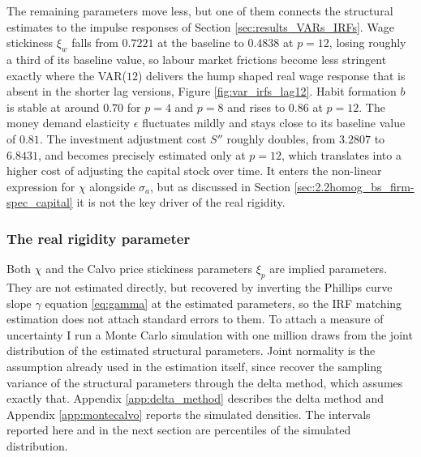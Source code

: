 \documentclass[12pt, a4paper]{article}
\begin{document}
The remaining parameters move less, but one of them connects the structural estimates to the
impulse responses of Section \ref{sec:results_VARs_IRFs}. Wage stickiness $\xi_w$ falls from
$0.7221$ at the baseline to $0.4838$ at $p = 12$, losing roughly a third of its baseline value,
so labour market frictions become less stringent exactly where the VAR($12$) delivers the hump
shaped real wage response that is absent in the shorter lag versions, Figure
\ref{fig:var_irfs_lag12}. Habit formation $b$ is stable at around $0.70$ for $p = 4$ and
$p = 8$ and rises to $0.86$ at $p = 12$. The money demand elasticity $\epsilon$ fluctuates
mildly and stays close to its baseline value of $0.81$. The investment adjustment cost $S''$
roughly doubles, from $3.2807$ to $6.8431$, and becomes precisely estimated only at $p = 12$,
which translates into a higher cost of adjusting the capital stock over time. It enters the
non-linear expression for $\chi$ alongside $\sigma_a$, but as discussed in Section
\ref{sec:2.2homog_bs_firm-spec_capital} it is not the key driver of the real rigidity.

\subsubsection*{The real rigidity parameter}
\label{sec:results_chi}

Both $\chi$ and the Calvo price stickiness parameters $\xi_p$ are implied parameters. They are
not estimated directly, but recovered by inverting the Phillips curve slope $\gamma$ equation
\eqref{eq:gamma} at the estimated parameters, so the IRF matching estimation does not attach
standard errors to them. To attach a measure of uncertainty I run a Monte Carlo simulation with
one million draws from the joint distribution of the estimated structural parameters. Joint
normality is the assumption already used in the estimation itself, since \citet{ACEL2005WP}
recover the sampling variance of the structural parameters through the delta method, which
assumes exactly that. Appendix \ref{app:delta_method} describes the delta method and Appendix
\ref{app:montecalvo} reports the simulated densities. The intervals reported here
and in the next section are percentiles of the simulated distribution.

    {}
    {\noindent{}}
\FloatBarrier
\end{document}
